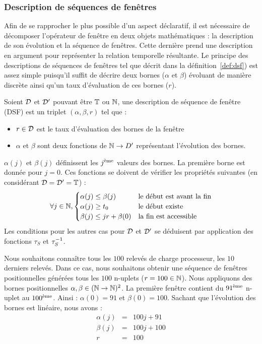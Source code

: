 \subsubsection{Description de séquences de fenêtres}
Afin de se rapprocher le plus possible d'un aspect déclaratif, il est nécessaire de décomposer l'opérateur de fenêtre en deux objets mathématiques : la description de son évolution et la séquence de fenêtres. Cette dernière prend une description en argument pour représenter la relation temporelle résultante. Le principe des descriptions de séquences de fenêtres tel que décrit dans la définition~\ref{def:dsf}) est assez simple puisqu'il suffit de décrire deux bornes ($\alpha$ et $\beta$) évoluant de manière discrète ainsi qu'un taux d'évaluation de ces bornes ($r$).

\begin{defi}\label{def:dsf}
    Soient $\mathcal{D}$ et $\mathcal{D}'$ pouvant être $\mathbb{T}$ ou $\mathbb{N}$, une description de séquence de fenêtre (DSF) est un triplet $(\alpha,\beta,r)$ tel que :
\begin{itemize}
    \item $r \in \mathcal{D}$ est le taux d'évaluation des bornes de la fenêtre
    \item $\alpha$ et $\beta$ sont deux fonctions de $\mathbb{N}\to D'$ représentant l'évolution des bornes.
\end{itemize}

$\alpha(j)$ et $\beta(j)$ définissent les $j^{\textrm{\`{e}me}}$ valeurs des bornes. La première borne est donnée pour $j=0$. Ces fonctions se doivent de vérifier les propriétés suivantes (en considérant $\mathcal{D}=\mathcal{D}'=\mathbb{T}$) :
$$\forall j \in \mathbb{N}, \begin{cases} \alpha(j) \leq \beta(j) & \textrm{le début est avant la fin}\\ \alpha(j) \geq t_0 & \textrm{le début existe} \\ \beta(j) \leq jr + \beta(0) & \textrm{la fin est accessible} \end{cases}$$
    Les conditions pour les autres cas pour $\mathcal{D}$ et $\mathcal{D}'$ se déduisent par application des fonctions $\tau_S$ et $\tau^{-1}_S$.
\end{defi}

\begin{example}
    Nous souhaitons connaître tous les $100$ relevés de charge processeur, les $10$ derniers relevés. Dans ce cas, nous souhaitons obtenir une séquence de fenêtres positionnelles générées tous les $100$ n-uplets ($r=100\in \mathbb{N}$). Nous appliquons des bornes positionnelles $\alpha,\beta \in (\mathbb{N}\to\mathbb{N})^2$. La première fenêtre contient du $91^{\textrm{\`{e}me}}$ n-uplet au $100^{\textrm{\`{e}me}}$. Ainsi : $\alpha(0) = 91$ et $\beta(0) = 100$. Sachant que l'évolution des bornes est linéaire, nous avons :
\begin{eqnarray*}
 \alpha(j) &=& 100j+91\\
 \beta(j) &=& 100j + 100\\
 r & = & 100
\end{eqnarray*}
\end{example}

